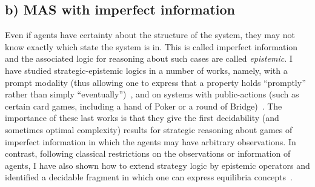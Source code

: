 \documentclass[10pt,a4paper,sans]{moderncv}
\begin{document}
\subsection{b) MAS with imperfect information}
Even if agents have certainty about the structure of the system, they may not know exactly which state the system is in. This is called imperfect information and the associated logic for reasoning about such cases are called \emph{epistemic}. I have studied strategic-epistemic logics in a number of works, namely, with a prompt modality (thus allowing one to express that a property holds ``promptly'' rather than simply ``eventually'')~\cite{DBLP:conf/kr/AminofMRZ16}, and on systems with public-actions (such as certain card games, including a hand of Poker or a round of Bridge)~\cite{BLMR17,BLMR17IJCAI}. The importance of these last works is that they give the first decidability (and sometimes optimal complexity) results for strategic reasoning about games of imperfect information in which the agents may have arbitrary observations. In contrast, following classical restrictions on the observations or information of agents, I have also shown how to extend strategy logic by epistemic operators and identified a decidable fragment in which one can express equilibria concepts~\cite{BMMRV17}.
\newline

\end{document}
